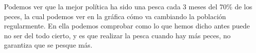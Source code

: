 \documentclass[11pt,a4paper]{report}
\begin{document}
\begin{table}[H]
\centering
{}
\end{table}

Podemos ver que la mejor política ha sido una pesca cada 3 meses del 70\% de los peces, la cual podemos ver en la gráfica cómo va cambiando
la población regularmente. En ella podemos comprobar como lo que hemos dicho antes puede no ser del todo cierto, y es que realizar la pesca
cuando hay más peces, no garantiza que se pesque más.
\end{document}
